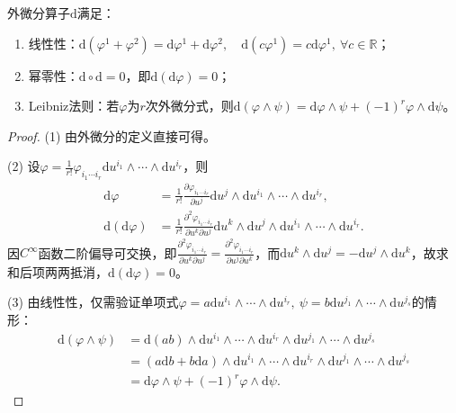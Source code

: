 \documentclass[../../main.tex]{subfiles}%
\begin{document}
\begin{theorem}
外微分算子$\mathrm{d}$满足：
\begin{enumerate}[(1)]
\item 线性性：$\mathrm{d}(\varphi^1+\varphi^2)=\mathrm{d}\varphi^1+\mathrm{d}\varphi^2,\quad \mathrm{d}(c\varphi^1)=c\mathrm{d}\varphi^1,\ \forall c\in\mathbb{R}$；
\item 幂零性：$\mathrm{d}\circ\mathrm{d}=0$，即$\mathrm{d}(\mathrm{d}\varphi)=0$；
\item Leibniz法则：若$\varphi$为$r$次外微分式，则$\mathrm{d}(\varphi\wedge\psi)=\mathrm{d}\varphi\wedge\psi+(-1)^r\varphi\wedge\mathrm{d}\psi$。
\end{enumerate}
\end{theorem}
\begin{proof}
(1) 由外微分的定义直接可得。

(2) 设$\varphi=\frac{1}{r!}\varphi_{i_1\cdots i_r}\mathrm{d}u^{i_1}\wedge\cdots\wedge\mathrm{d}u^{i_r}$，则
\begin{align*}
\mathrm{d}\varphi&=\frac{1}{r!}\frac{\partial\varphi_{i_1\cdots i_r}}{\partial u^j}\mathrm{d}u^j\wedge\mathrm{d}u^{i_1}\wedge\cdots\wedge\mathrm{d}u^{i_r},\\
\mathrm{d}(\mathrm{d}\varphi)&=\frac{1}{r!}\frac{\partial^2\varphi_{i_1\cdots i_r}}{\partial u^k\partial u^j}\mathrm{d}u^k\wedge\mathrm{d}u^j\wedge\mathrm{d}u^{i_1}\wedge\cdots\wedge\mathrm{d}u^{i_r}.
\end{align*}
因$C^\infty$函数二阶偏导可交换，即$\frac{\partial^2\varphi_{i_1\cdots i_r}}{\partial u^k\partial u^j}=\frac{\partial^2\varphi_{i_1\cdots i_r}}{\partial u^j\partial u^k}$，而$\mathrm{d}u^k\wedge\mathrm{d}u^j=-\mathrm{d}u^j\wedge\mathrm{d}u^k$，故求和后项两两抵消，$\mathrm{d}(\mathrm{d}\varphi)=0$。

(3) 由线性性，仅需验证单项式$\varphi=a\mathrm{d}u^{i_1}\wedge\cdots\wedge\mathrm{d}u^{i_r},\ \psi=b\mathrm{d}u^{j_1}\wedge\cdots\wedge\mathrm{d}u^{j_s}$的情形：
\begin{align*}
\mathrm{d}(\varphi\wedge\psi)&=\mathrm{d}(ab)\wedge\mathrm{d}u^{i_1}\wedge\cdots\wedge\mathrm{d}u^{i_r}\wedge\mathrm{d}u^{j_1}\wedge\cdots\wedge\mathrm{d}u^{j_s}\\
&=(a\mathrm{d}b+b\mathrm{d}a)\wedge\mathrm{d}u^{i_1}\wedge\cdots\wedge\mathrm{d}u^{i_r}\wedge\mathrm{d}u^{j_1}\wedge\cdots\wedge\mathrm{d}u^{j_s}\\
&=\mathrm{d}\varphi\wedge\psi+(-1)^r\varphi\wedge\mathrm{d}\psi.
\end{align*}
\end{proof}
\end{document}
